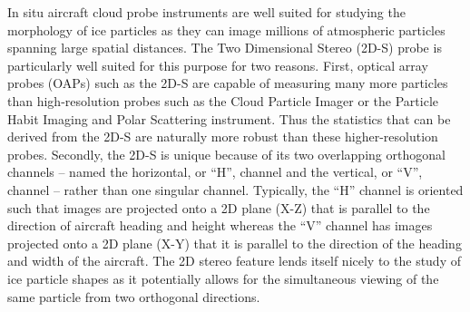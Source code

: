 \documentclass[amt, manuscript]{copernicus}
\begin{document}


In situ aircraft cloud probe instruments are well suited for studying the morphology of ice particles as they can image millions of atmospheric particles spanning large spatial distances. The Two Dimensional Stereo (2D-S) probe \citep{Lawson2006} is particularly well suited for this purpose for two reasons. First, optical array probes (OAPs) such as the 2D-S are capable of measuring many more particles than high-resolution probes such as the Cloud Particle Imager \citep[CPI;][]{Lawson2001} or the Particle Habit Imaging and Polar Scattering \citep[PHIPS;][]{Abdelmonem2016} instrument. Thus the statistics that can be derived from the 2D-S are naturally more robust than these higher-resolution probes. Secondly, the 2D-S is unique because of its two overlapping orthogonal channels -- named the horizontal, or ``H'', channel and the vertical, or ``V'', channel -- rather than one singular channel. Typically, the ``H'' channel is oriented such that images are projected onto a 2D plane (X-Z) that is parallel to the direction of aircraft heading and height whereas the ``V'' channel has images projected onto a 2D plane (X-Y) that it is parallel to the direction of the heading and width of the aircraft. The 2D stereo feature lends itself nicely to the study of ice particle shapes as it potentially allows for the simultaneous viewing of the same particle from two orthogonal directions.



\end{document}
